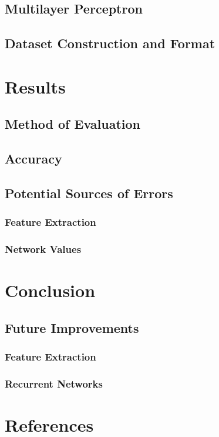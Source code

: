 \documentclass[12pt]{article}
\begin{document}
\subsection{Multilayer Perceptron}


\subsection{Dataset Construction and Format}



\section{Results}

\subsection{Method of Evaluation}

\subsection{Accuracy}

\subsection{Potential Sources of Errors}

\subsubsection{Feature Extraction}

\subsubsection{Network Values}

\section{Conclusion}

\subsection{Future Improvements}

\subsubsection{Feature Extraction}

\subsubsection{Recurrent Networks}


\section{References}
\end{document}
